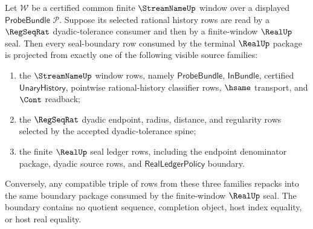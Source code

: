 \begin{theorem}
\label{thm:streamname-regseqrat-realup-source-boundary-exhaustion}
Let $\mathcal W$ be a certified common finite $\StreamNameUp$ window over a
displayed $\mathsf{ProbeBundle}$ $\mathcal P$. Suppose its selected rational
history rows are read by a $\RegSeqRat$ dyadic-tolerance consumer and then by a
finite-window $\RealUp$ seal. Then every seal-boundary row consumed by the
terminal $\RealUp$ package is projected from exactly one of the following
visible source families:
\begin{enumerate}
  \item the $\StreamNameUp$ window rows, namely $\mathsf{ProbeBundle}$,
  $\mathsf{InBundle}$, certified $\mathsf{UnaryHistory}$, pointwise
  rational-history classifier rows, $\hsame$ transport, and $\Cont$ readback;
  \item the $\RegSeqRat$ dyadic endpoint, radius, distance, and regularity rows
  selected by the accepted dyadic-tolerance spine;
  \item the finite $\RealUp$ seal ledger rows, including the endpoint
  denominator package, dyadic source rows, and $\mathsf{RealLedgerPolicy}$
  boundary.
\end{enumerate}
Conversely, any compatible triple of rows from these three families repacks into
the same boundary package consumed by the finite-window $\RealUp$ seal. The
boundary contains no quotient sequence, completion object, host index equality,
or host real equality.
\end{theorem}
